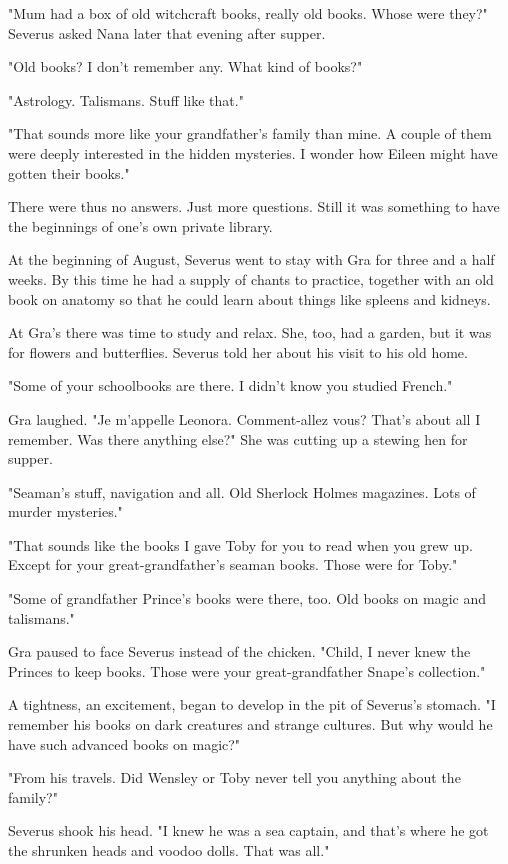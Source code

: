 "Mum had a box of old witchcraft books, really old books. Whose were they?" Severus asked Nana later that evening after supper.

"Old books? I don't remember any. What kind of books?"

"Astrology. Talismans. Stuff like that."

"That sounds more like your grandfather's family than mine. A couple of them were deeply interested in the hidden mysteries. I wonder how Eileen might have gotten their books."

There were thus no answers. Just more questions. Still it was something to have the beginnings of one's own private library.

At the beginning of August, Severus went to stay with Gra for three and a half weeks. By this time he had a supply of chants to practice, together with an old book on anatomy so that he could learn about things like spleens and kidneys.

At Gra's there was time to study and relax. She, too, had a garden, but it was for flowers and butterflies. Severus told her about his visit to his old home.

"Some of your schoolbooks are there. I didn't know you studied French."

Gra laughed. "Je m'appelle Leonora. Comment-allez vous? That's about all I remember. Was there anything else?" She was cutting up a stewing hen for supper.

"Seaman's stuff, navigation and all. Old Sherlock Holmes magazines. Lots of murder mysteries."

"That sounds like the books I gave Toby for you to read when you grew up. Except for your great-grandfather's seaman books. Those were for Toby."

"Some of grandfather Prince's books were there, too. Old books on magic and talismans."

Gra paused to face Severus instead of the chicken. "Child, I never knew the Princes to keep books. Those were your great-grandfather Snape's collection."

A tightness, an excitement, began to develop in the pit of Severus's stomach. "I remember his books on dark creatures and strange cultures. But why would he have such advanced books on magic?"

"From his travels. Did Wensley or Toby never tell you anything about the family?"

Severus shook his head. "I knew he was a sea captain, and that's where he got the shrunken heads and voodoo dolls. That was all."

